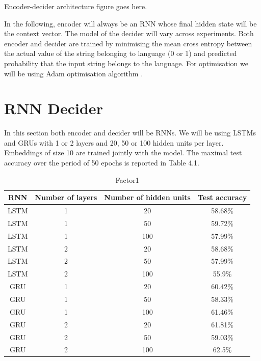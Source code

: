 \documentclass[titlepage]{report}
\newcommand{\otoprule}{\midrule[\heavyrulewidth]}
\begin{document}
\begin{center}
Encoder-decider architecture figure goes here.
\end{center}

In the following, encoder will always be an RNN whose final hidden state will be the context vector. The model of the decider will vary across experiments. Both encoder and decider are trained by minimising the mean cross entropy between the actual value of the string belonging to language (0 or 1) and predicted probability that the input string belongs to the language. For optimisation we will be using Adam optimisation algorithm \cite{kingma2014adam}.

\section{RNN Decider}

In this section both encoder and decider will be RNNs. We will be using LSTMs and GRUs with 1 or 2 layers and 20, 50 or 100 hidden units per layer. Embeddings of size 10 are trained jointly with the model. The maximal test accuracy over the period of 50 epochs is reported in Table 4.1.

\begin{table}[H]
\caption{Factor1}
\centering
\begin{tabular}{cccc}
\toprule%
\textbf{RNN} & \textbf{Number of layers} & \textbf{Number of hidden units} & \textbf{Test accuracy} \\
\otoprule%
LSTM & 1 & 20 & 58.68\% \\
LSTM & 1 & 50 & 59.72\% \\
LSTM & 1 & 100 & 57.99\% \\
LSTM & 2 & 20 & 58.68\% \\
LSTM & 2 & 50 & 57.99\% \\
LSTM & 2 & 100 & 55.9\% \\
GRU & 1 & 20 & 60.42\% \\ 
GRU & 1 & 50 & 58.33\% \\
GRU & 1 & 100 & 61.46\% \\
GRU & 2 & 20 & 61.81\% \\
GRU & 2 & 50 & 59.03\% \\
GRU & 2 & 100 & 62.5\% \\
\bottomrule
\end{tabular}
\end{table}
\end{document}
